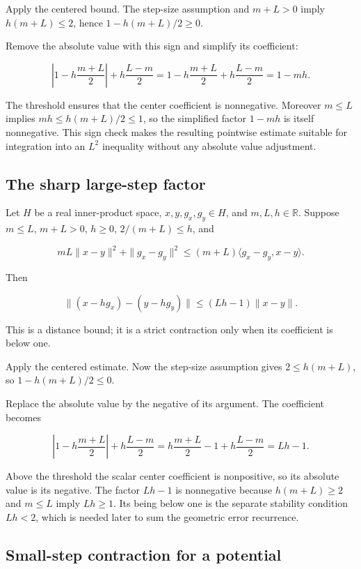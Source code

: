 \documentclass[11pt,a4paper]{report}
\begin{document}
Apply the centered bound. The step-size assumption and \(m+L>0\) imply \(h(m+L)\le2\), hence \(1-h(m+L)/2\ge0\).



Remove the absolute value with this sign and simplify its coefficient:

\[\left|1-h\frac{m+L}{2}\right|+h\frac{L-m}{2}=1-h\frac{m+L}{2}+h\frac{L-m}{2}=1-mh.\]

The threshold ensures that the center coefficient is nonnegative. Moreover \(m\le L\) implies \(mh\le h(m+L)/2\le1\), so the simplified factor \(1-mh\) is itself nonnegative. This sign check makes the resulting pointwise estimate suitable for integration into an \(L^2\) inequality without any absolute value adjustment.

\subsection{\texorpdfstring{The sharp large-step factor}{The sharp large-step factor}}
\label{report-step-UnadjustedLangevin-SharpContraction-lean-6}


Let \(H\) be a real inner-product space, \(x,y,g_x,g_y\in H\), and \(m,L,h\in\mathbb R\). Suppose \(m\le L\), \(m+L>0\), \(h\ge0\), \(2/(m+L)\le h\), and

\[mL\|x-y\|^2+\|g_x-g_y\|^2\le(m+L)\langle g_x-g_y,x-y\rangle.\]

Then

\[\|(x-hg_x)-(y-hg_y)\|\le(Lh-1)\|x-y\|.\]

This is a distance bound; it is a strict contraction only when its coefficient is below one.



Apply the centered estimate. Now the step-size assumption gives \(2\le h(m+L)\), so \(1-h(m+L)/2\le0\).



Replace the absolute value by the negative of its argument. The coefficient becomes

\[\left|1-h\frac{m+L}{2}\right|+h\frac{L-m}{2}=h\frac{m+L}{2}-1+h\frac{L-m}{2}=Lh-1.\]

Above the threshold the scalar center coefficient is nonpositive, so its absolute value is its negative. The factor \(Lh-1\) is nonnegative because \(h(m+L)\ge2\) and \(m\le L\) imply \(Lh\ge1\). Its being below one is the separate stability condition \(Lh<2\), which is needed later to sum the geometric error recurrence.

\subsection{\texorpdfstring{Small-step contraction for a potential}{Small-step contraction for a potential}}
\label{report-step-UnadjustedLangevin-SharpContraction-lean-7}
\end{document}
